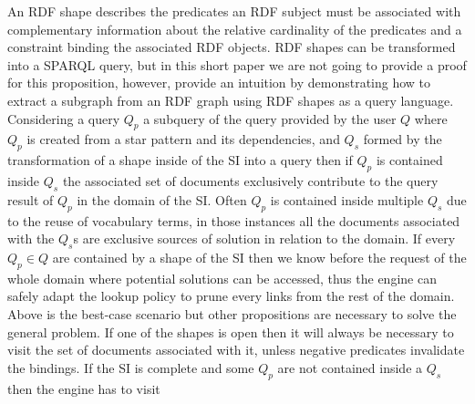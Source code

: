 An RDF shape describes the predicates an RDF subject must be associated with complementary information about
the relative cardinality of the predicates and a constraint binding the associated RDF objects.
RDF shapes can be transformed into a SPARQL query, but
in this short paper we are not going to provide a proof for this proposition, however,
\citeauthor{Delva2021} provide an intuition by demonstrating how to extract 
a subgraph from an RDF graph using RDF shapes as a query language.
Considering a query $Q_p$ a subquery of the query provided by the user $Q$
where $Q_p$ is created from a star pattern and its dependencies, and $Q_s$ formed by the transformation of a shape inside of the SI
into a query then if  $Q_p$ is contained inside $Q_s$ the associated 
set of documents exclusively contribute to the query result of $Q_p$ in the domain of the SI.
Often $Q_p$ is contained inside multiple $Q_s$ due to the reuse of vocabulary terms,
in those instances all the documents associated with the $Q_s$s are exclusive sources of solution in relation to the domain.
If every $Q_p \in Q$ are contained by a shape of the SI then we know before the request of the whole domain
where potential solutions can be accessed, thus the engine can safely adapt the lookup policy to prune every links from the rest of the domain.
Above is the best-case scenario but other propositions are necessary to solve the general problem.
If one of the shapes is open then it will always be necessary to visit the set of documents associated
with it, unless negative predicates invalidate the bindings.
If the SI is complete and some $Q_p$ are not contained inside a $Q_s$ then the engine has to visit
